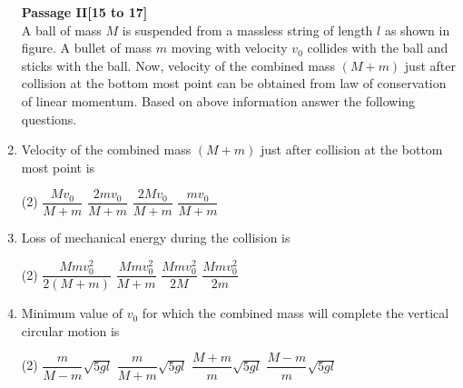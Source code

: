 \documentclass{article}
\renewcommand{\ans}{\quad}
\begin{document}
\begin{enumerate}
    {\textbf{Passage II[15 to 17]}}\\
    A ball of mass $M$ is suspended from a massless string of length $l$ as shown in figure. A bullet of mass $m$ moving with velocity $v_0$ collides with the ball and sticks with the ball. Now, velocity of the combined mass $(M + m)$ just after collision at the bottom most point can be obtained from law of conservation of linear momentum. Based on above information answer the following questions.
    \begin{center}
    \end{center}
    \item Velocity of the combined mass $(M + m)$ just after collision at the bottom most point is
    \begin{tasks}(2)
        \task $\dfrac{Mv_0}{M+m}$
        \task $\dfrac{2mv_0}{M+m}$
        \task $\dfrac{2Mv_0}{M+m}$
        \task $\dfrac{mv_0}{M+m}$\ans
    \end{tasks}

    \item Loss of mechanical energy during the collision is
    \begin{tasks}(2)
        \task $\dfrac{Mmv_0^2}{2(M+m)}$\ans
        \task $\dfrac{Mmv_0^2}{M+m}$
        \task $\dfrac{Mmv_0^2}{2M}$
        \task $\dfrac{Mmv_0^2}{2m}$
    \end{tasks}

    \item Minimum value of $v_0$ for which the combined mass will complete the vertical circular motion is
    \begin{tasks}(2)
        \task $\dfrac{m}{M-m}\sqrt{5gl}$
        \task $\dfrac{m}{M+m}\sqrt{5gl}$
        \task $\dfrac{M+m}{m}\sqrt{5gl}$\ans
        \task $\dfrac{M-m}{m}\sqrt{5gl}$
    \end{tasks}


\end{enumerate}
\end{document}
